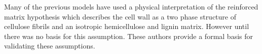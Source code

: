 Many of the previous models have used a physical interpretation of the
reinforced matrix hypothesis \citep{Barber_1964} which describes the cell wall
as a two phase structure of cellulose fibrils and an isotropic hemicellulose and
lignin matrix. However until \citet{Yamamoto_2007} there was
no basis for this assumption. These authors provide a formal basis for validating
these assumptions.